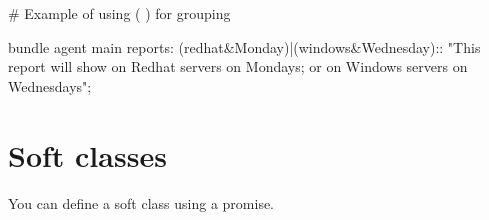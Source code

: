\begin{codelisting}
\begin{code}
# Example of using ( ) for grouping

bundle agent main
{
  reports:
    (redhat&Monday)|(windows&Wednesday)::
      "This report will show on Redhat servers on Mondays;
       or on Windows servers on Wednesdays";
}
\end{code}
\end{codelisting}





\section{Soft classes}

You can define a soft class using a  promise.

